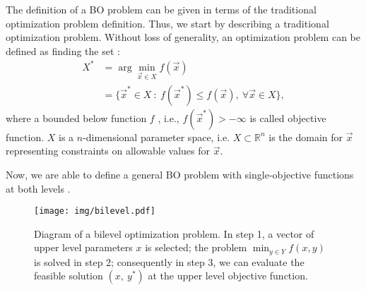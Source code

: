 \documentclass[conference]{IEEEtran}
\theoremstyle{definition}
\begin{document}
The definition of a BO problem can be given in terms of the traditional
optimization problem definition. Thus, we start by describing a traditional optimization
problem. Without loss of generality, an optimization problem can be defined as
finding the set \cite{chong2013introduction,rao2009engineering}:
% 
\begin{align}
    \label{eqn:Xargmin}
    X^* &= \arg \min_{\vec{x} \in X} f(\vec{x}) \\ \nonumber
    &= \{ \vec{x}^* \in X \ : \ f(\vec{x}^*) \leq f( \vec{x} ), \ 
    \forall
    \vec{x} \in X \},
\end{align}
% 
where a bounded below function $f$ , i.e., $f(\vec{x}^*)> -\infty$ is called objective
function. $X$ is a $n$-dimensional parameter space, i.e. $X \subset \mathbb{R}^n$
is the domain for $\vec{x}$ representing constraints on
allowable values for $\vec{x}$.

Now, we are able to define a general BO problem with
single-objective functions at both levels
\cite{bard2013practical,dempe2002foundations}.

\begin{figure}[t]
    \centering
    \texttt{[image: img/bilevel.pdf]}
    \caption{ Diagram of a bilevel optimization problem. In step 1, a vector of %
              upper level parameters $x$ is selected; the problem $\min_{y\in Y} %
              f(x, y)$ is solved in step 2; consequently in step 3, we can evaluate %
              the feasible solution $(x,\ y^*)$ at the upper level objective function. %
            }
    \label{fig:bilevel}
\end{figure}
% 
\end{document}
